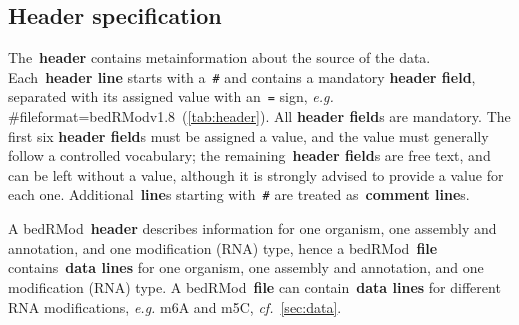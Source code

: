 \documentclass[11pt]{article}
\begin{document}
\subsection{Header specification}\label{sec:header}

The~\textbf{header} contains metainformation about the source of the data. Each~\textbf{header line} starts with a~\texttt{\#} and contains a
mandatory \textbf{header field}, separated with its assigned value with an~\texttt{=} sign, \textit{e.g.} 
\textsf{\#fileformat=}bedRModv1.8~(\autoref{tab:header}). All \textbf{header field}s are mandatory. The first six \textbf{header field}s must be assigned a
value, and the value must generally follow a controlled vocabulary; the remaining~\textbf{header field}s are free text, and 
can be left without a value, although it is strongly advised to provide a value for each one. Additional~\textbf{line}s starting with~\texttt{\#} are treated as~\textbf{comment line}s.

A \ac{bedRMod}~\textbf{header} describes information  for one organism, one assembly and annotation, and one modification (RNA) type, hence a \ac{bedRMod}~\textbf{file} contains~\textbf{data lines} for one organism, one assembly and annotation, and one modification (RNA) type. A \ac{bedRMod}~\textbf{file} can 
contain~\textbf{data lines} for different RNA modifications, \textit{e.g.} m6A and m5C, \textit{cf.}~\autoref{sec:data}.
\end{document}
